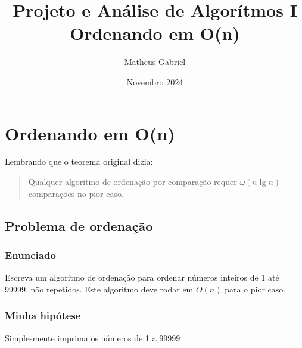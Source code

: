 \documentclass[11pt]{article}
\author{Matheus Gabriel}
\date{Novembro 2024}
\title{Projeto e Análise de Algorítmos I\\\medskip
\large Ordenando em O(n)}
\begin{document}
\maketitle
\tableofcontents

\section{Ordenando em O(n)}
\label{sec:orgbb0ca90}
Lembrando que o teorema original dizia:
\begin{quote}
Qualquer algoritmo de ordenação por comparação requer \(\omega(n \lg n)\) comparações no pior caso.
\end{quote}
\subsection{Problema de ordenação}
\label{sec:org4d234b2}

\subsubsection{Enunciado}
\label{sec:org8816c93}
Escreva um algoritmo de ordenação para ordenar números inteiros de 1 até 99999, não repetidos.
Este algoritmo deve rodar em \(O(n)\) para o pior caso.
\subsubsection{Minha hipótese}
\label{sec:org4ce77d2}
Simplesmente imprima os números de 1 a 99999
\end{document}
